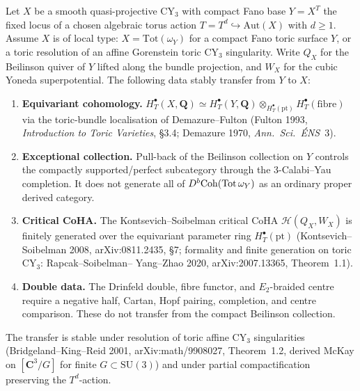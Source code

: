\begin{theorem}
\label{thm:cy-c-beyond-stable-transfer-toric}
Let $X$ be a smooth quasi-projective CY$_3$ with compact Fano base
$Y = X^{T}$ the fixed locus of a chosen algebraic torus action
$T = T^d \hookrightarrow \mathrm{Aut}(X)$ with $d \geq 1$. Assume $X$
is of local type: $X = \mathrm{Tot}(\omega_Y)$ for a compact Fano toric
surface $Y$, or a toric resolution of an affine Gorenstein toric CY$_3$
singularity. Write $Q_X$ for the Beilinson quiver of $Y$ lifted along
the bundle projection, and $W_X$ for the cubic Yoneda superpotential.
The following data stably transfer from $Y$ to $X$:
\begin{enumerate}[label=\textup{(T\arabic*)}]
 \item \textbf{Equivariant cohomology.}
 $H^\bullet_{T}(X, \mathbf Q) \simeq H^\bullet_T(Y, \mathbf Q)
 \otimes_{H^\bullet_T(\mathrm{pt})} H^\bullet_T(\mathrm{fibre})$
 via the toric-bundle localisation of Demazure--Fulton
 (Fulton 1993, \emph{Introduction to Toric Varieties},
 \S 3.4; Demazure 1970, \emph{Ann.\ Sci.\ \'ENS}~3).
	 \item \textbf{Exceptional collection.} Pull-back of the Beilinson
	 collection on $Y$ controls the compactly supported/perfect
	 subcategory through the \(3\)-Calabi--Yau completion. It does not
	 generate all of \(D^b\mathrm{Coh}(\mathrm{Tot}\,\omega_Y)\) as an ordinary
	 proper derived category.
 \item \textbf{Critical CoHA.} The Kontsevich--Soibelman critical
 CoHA $\mathcal H(Q_X, W_X)$ is finitely generated over the
 equivariant parameter ring $H^\bullet_T(\mathrm{pt})$
 (Kontsevich--Soibelman 2008, arXiv:0811.2435, \S 7; formality
 and finite generation on toric CY$_3$: Rapcak--Soibelman--%
 Yang--Zhao 2020, arXiv:2007.13365, Theorem~1.1).
	 \item \textbf{Double data.} The Drinfeld double, fibre functor, and
	 \(E_2\)-braided centre require a negative half, Cartan, Hopf
	 pairing, completion, and centre comparison. These do not transfer
	 from the compact Beilinson collection.
\end{enumerate}
The transfer is stable under resolution of toric affine CY$_3$
singularities (Bridgeland--King--Reid 2001, arXiv:math/9908027,
Theorem~1.2, derived McKay on $[\mathbf C^3/G]$ for finite $G \subset
\mathrm{SU}(3)$) and under partial compactification preserving the
$T^d$-action.
\end{theorem}

